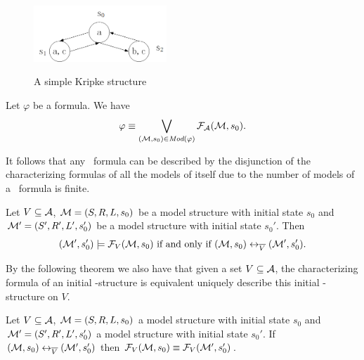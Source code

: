 \documentclass{article}
\begin{document}
\begin{example}
\begin{figure}
  \centering
  \includegraphics[width=5cm]{k1.png}\\
  \caption{A simple Kripke structure}\label{Kripke_1}
\end{figure}
\end{example}

\begin{lemma}\label{lem:models:formula}
  Let $\varphi$ be a formula. We have
  \begin{equation}
    \varphi\equiv \bigvee_{({\cal M}, s_0)\in\textit{Mod}(\varphi)}{\cal F}_{\cal A}({\cal M}, s_0).
\end{equation}
\end{lemma}
It follows that any \CTL\ formula can be described by the disjunction of the characterizing formulas of all the models of itself due to the number of models of a \CTL\ formula is finite.

\begin{theorem}\label{CF}
Let $V\subseteq {\cal A}$, ${\cal M}=(S,R,L,s_0)$ be a model structure with initial state $s_0$
and ${\cal M}'=(S',R', L',s_0')$ be a model structure with initial state $s_0'$.
Then  $$({\cal M}',s_0') \models {\cal F}_V({\cal M},s_0)
\mbox{ if and only if }
({\cal M},s_0) \leftrightarrow_{\overline V} ({\cal M}',s_0').$$
\end{theorem}

By the following theorem we also have that given a set $V\subseteq {\cal A}$, the characterizing formula of an initial \MPK-structure is equivalent uniquely describe this initial \MPK-structure on $V$.
\begin{theorem}\label{thm:VBChFEQ}
Let $V\subseteq {\cal A}$, ${\cal M}=(S,R,L,s_0)$ a model structure with initial state $s_0$
and ${\cal M}'=(S',R', L',s_0')$ a model structure with initial state $s_0'$.
If $({\cal M},s_0) \leftrightarrow_{\overline V} ({\cal M}',s_0')$ then ${\cal F}_V({\cal M}, s_0) \equiv {\cal F}_V({\cal M}', s_0')$.
\end{theorem}
\end{document}
